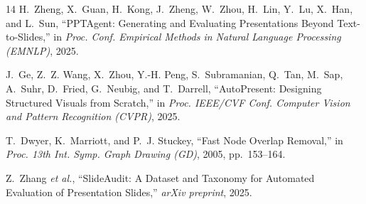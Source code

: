 \documentclass[10pt,journal,compsoc]{IEEEtran}
\begin{document}
\begin{thebibliography}{14}
H.~Zheng, X.~Guan, H.~Kong, J.~Zheng, W.~Zhou, H.~Lin, Y.~Lu, X.~Han, and L.~Sun, ``PPTAgent: Generating and Evaluating Presentations Beyond Text-to-Slides,'' in \emph{Proc. Conf. Empirical Methods in Natural Language Processing (EMNLP)}, 2025.

J.~Ge, Z.~Z. Wang, X.~Zhou, Y.-H. Peng, S.~Subramanian, Q.~Tan, M.~Sap, A.~Suhr, D.~Fried, G.~Neubig, and T.~Darrell, ``AutoPresent: Designing Structured Visuals from Scratch,'' in \emph{Proc. IEEE/CVF Conf. Computer Vision and Pattern Recognition (CVPR)}, 2025.

T.~Dwyer, K.~Marriott, and P.~J. Stuckey, ``Fast Node Overlap Removal,'' in \emph{Proc. 13th Int. Symp. Graph Drawing (GD)}, 2005, pp.~153--164.

Z.~Zhang \emph{et al.}, ``SlideAudit: A Dataset and Taxonomy for Automated Evaluation of Presentation Slides,'' \emph{arXiv preprint}, 2025.

\end{thebibliography}
\end{document}

